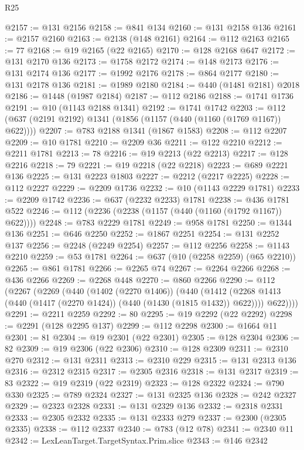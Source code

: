 \begin{lexlean}{R25}
\begin{coremodule}
@2157 := @131 @2156
@2158 := @841 @134
@2160 := @131 @2158 @136
@2161 := @2157 @2160
@2163 := @2138 (@148 @2161)
@2164 := @112 @2163
@2165 := 77
@2168 := @19 @2165 (@22 @2165)
@2170 := @128 @2168 @647
@2172 := @131 @2170 @136
@2173 := @1758 @2172
@2174 := @148 @2173
@2176 := @131 @2174 @136
@2177 := @1992 @2176
@2178 := @864 @2177
@2180 := @131 @2178 @136
@2181 := @1989 @2180
@2184 := @440 (@1481 @2181) @2018
@2186 := @1448 (@1987 @2184)
@2187 := @112 @2186
@2188 := @1741 @1736
@2191 := @10 (@1143 @2188 @1341)
@2192 := @1741 @1742
@2203 := @112 (@637 (@2191 @2192) @1341 (@1856 (@1157 (@440 (@1160 (@1769 @1167)) @622))))
@2207 := @783 @2188 @1341 (@1867 @1583)
@2208 := @112 @2207
@2209 := @10 @1781
@2210 := @2209 @36
@2211 := @122 @2210
@2212 := @2211 @1781
@2213 := 78
@2216 := @19 @2213 (@22 @2213)
@2217 := @128 @2216
@2218 := 79
@2221 := @19 @2218 (@22 @2218)
@2223 := @689 @2221 @136
@2225 := @131 @2223 @1803
@2227 := @2212 (@2217 @2225)
@2228 := @112 @2227
@2229 := @2209 @1736
@2232 := @10 (@1143 @2229 @1781)
@2233 := @2209 @1742
@2236 := @637 (@2232 @2233) @1781
@2238 := @436 @1781 @522
@2246 := @112 (@2236 (@2238 (@1157 (@440 (@1160 (@1792 @1167)) @622))))
@2248 := @783 @2229 @1781
@2249 := @958 @1781
@2250 := @1344 @136
@2251 := @646 @2250
@2252 := @1867 @2251
@2254 := @131 @2252 @137
@2256 := @2248 (@2249 @2254)
@2257 := @112 @2256
@2258 := @1143 @2210
@2259 := @53 @1781
@2264 := @637 (@10 (@2258 @2259) (@65 @2210))
@2265 := @861 @1781
@2266 := @2265 @74
@2267 := @2264 @2266
@2268 := @436 @2266
@2269 := @2268 @448
@2270 := @860 @2266
@2290 := @112
    (@2267
      (@2269
        (@440
          (@1402 (@2270 @1406))
          (@440
            (@1412 (@2268 @1413 (@440 (@1417 (@2270 @1424)) (@440 (@1430 (@1815 @1432)) @622))))
            @622))))
@2291 := @2211 @2259
@2292 := 80
@2295 := @19 @2292 (@22 @2292)
@2298 := @2291 (@128 @2295 @137)
@2299 := @112 @2298
@2300 := @1664 @11
@2301 := 81
@2304 := @19 @2301 (@22 @2301)
@2305 := @128 @2304
@2306 := 82
@2309 := @19 @2306 (@22 @2306)
@2310 := @128 @2309
@2311 := @2310 @270
@2312 := @131 @2311
@2313 := @2310 @229
@2315 := @131 @2313 @136
@2316 := @2312 @2315
@2317 := @2305 @2316
@2318 := @131 @2317
@2319 := 83
@2322 := @19 @2319 (@22 @2319)
@2323 := @128 @2322
@2324 := @790 @330
@2325 := @789 @2324
@2327 := @131 @2325 @136
@2328 := @242 @2327
@2329 := @2323 @2328
@2331 := @131 @2329 @136
@2332 := @2318 @2331
@2333 := @2305 @2332
@2335 := @131 @2333 @279
@2337 := @2300 (@2305 @2335)
@2338 := @112 @2337
@2340 := @783 (@12 @78)
@2341 := @2340 @11
@2342 := LexLeanTarget.TargetSyntax.Prim.slice
@2343 := @146 @2342

\end{coremodule}
\end{lexlean}
